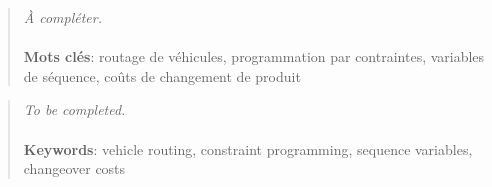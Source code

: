 \resume
{}
\vspace*{-6cm}
\begin{abstract}
\emph{À compléter.}

\paragraph{}
\textbf{Mots clés}: routage de véhicules, programmation par contraintes,
variables de séquence, coûts de changement de produit
\end{abstract}

\newpage
\thispagestyle{empty}
\begin{abstract}

\emph{To be completed.}

\paragraph{}
\textbf{Keywords}: vehicle routing, constraint programming, sequence variables,
changeover costs
\end{abstract}
